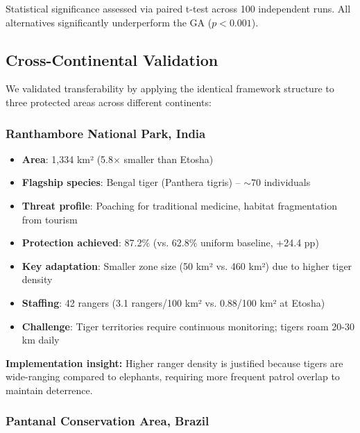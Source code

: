 Statistical significance assessed via paired t-test across 100 independent runs. All alternatives significantly underperform the GA ($p < 0.001$).

\subsection{Cross-Continental Validation}

We validated transferability by applying the identical framework structure to three protected areas across different continents:

\subsubsection{Ranthambore National Park, India}

\begin{itemize}
    \item \textbf{Area}: 1,334 km² (5.8$\times$ smaller than Etosha)
    \item \textbf{Flagship species}: Bengal tiger (Panthera tigris) -- $\sim$70 individuals
    \item \textbf{Threat profile}: Poaching for traditional medicine, habitat fragmentation from tourism
    \item \textbf{Protection achieved}: 87.2\% (vs. 62.8\% uniform baseline, +24.4 pp)
    \item \textbf{Key adaptation}: Smaller zone size (50 km² vs. 460 km²) due to higher tiger density
    \item \textbf{Staffing}: 42 rangers (3.1 rangers/100 km² vs. 0.88/100 km² at Etosha)
    \item \textbf{Challenge}: Tiger territories require continuous monitoring; tigers roam 20-30 km daily
\end{itemize}

\textbf{Implementation insight:} Higher ranger density is justified because tigers are wide-ranging compared to elephants, requiring more frequent patrol overlap to maintain deterrence.

\subsubsection{Pantanal Conservation Area, Brazil}

